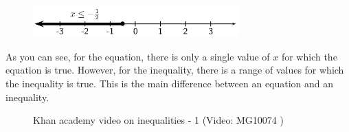     \setcounter{subfigure}{0}


	\begin{figure}[H] %
    \begin{center}
    \label{m39254*id157774!!!underscore!!!media}\label{m39254*id157774!!!underscore!!!printimage}\includegraphics[width=300px]{col11306.imgs/m39254_MG10C10_002.png} %
        
      \vspace{2pt}
    \vspace{.1in}
    
    \end{center}

 \end{figure}   

    \addtocounter{footnote}{-0}
    
      \par 
      \label{m39254*id157780}As you can see, for the equation, there is only a single value of \begin{math}x\end{math} for which the equation is true. However, for the inequality, there is a range of values for which the inequality is true. This is the main difference between an equation and an inequality.\par 
\label{m39254*eip-441}
    \setcounter{subfigure}{0}


	\begin{figure}[H] %
    
    
    \textnormal{Khan academy video on inequalities - 1}\vspace{.1in} \nopagebreak
  \label{m39254*yt-media4}\label{m39254*yt-video4}
             { (Video:  MG10074 )}
      
      \vspace{2pt}
    \vspace{.1in}
    
    

 \end{figure}   

    \addtocounter{footnote}{-0}
    \par \label{m39254*eip-749}
    \setcounter{subfigure}{0}



